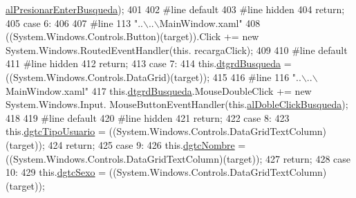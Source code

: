 \begin{DoxyCode}
      \hyperlink{class_proyecto___integrador__3_1_1_main_window_add266d3adbe6dc3acb7eddcbcbacf80e}{alPresionarEnterBusqueda});
401             
402 \textcolor{preprocessor}{            #line default}
403 \textcolor{preprocessor}{}\textcolor{preprocessor}{            #line hidden}
404 \textcolor{preprocessor}{}            \textcolor{keywordflow}{return};
405             \textcolor{keywordflow}{case} 6:
406             
407 \textcolor{preprocessor}{            #line 113 "..\(\backslash\)..\(\backslash\)MainWindow.xaml"}
408 \textcolor{preprocessor}{}            ((System.Windows.Controls.Button)(target)).Click += \textcolor{keyword}{new} System.Windows.RoutedEventHandler(\textcolor{keyword}{this}.
      recargaClick);
409             
410 \textcolor{preprocessor}{            #line default}
411 \textcolor{preprocessor}{}\textcolor{preprocessor}{            #line hidden}
412 \textcolor{preprocessor}{}            \textcolor{keywordflow}{return};
413             \textcolor{keywordflow}{case} 7:
414             this.\hyperlink{class_proyecto___integrador__3_1_1_main_window_aa4ad8e119bd619ccc03b22de048dfe57}{dtgrdBusqueda} = ((System.Windows.Controls.DataGrid)(target));
415             
416 \textcolor{preprocessor}{            #line 116 "..\(\backslash\)..\(\backslash\)MainWindow.xaml"}
417 \textcolor{preprocessor}{}            this.\hyperlink{class_proyecto___integrador__3_1_1_main_window_aa4ad8e119bd619ccc03b22de048dfe57}{dtgrdBusqueda}.MouseDoubleClick += \textcolor{keyword}{new} System.Windows.Input.
      MouseButtonEventHandler(this.\hyperlink{class_proyecto___integrador__3_1_1_main_window_a45bf387a5341eeedd23517408ad9a4c0}{alDobleClickBusqueda});
418             
419 \textcolor{preprocessor}{            #line default}
420 \textcolor{preprocessor}{}\textcolor{preprocessor}{            #line hidden}
421 \textcolor{preprocessor}{}            \textcolor{keywordflow}{return};
422             \textcolor{keywordflow}{case} 8:
423             this.\hyperlink{class_proyecto___integrador__3_1_1_main_window_a7760fc254a46e1c3b276f91e25f17a6a}{dgtcTipoUsuario} = ((System.Windows.Controls.DataGridTextColumn)(target));
424             \textcolor{keywordflow}{return};
425             \textcolor{keywordflow}{case} 9:
426             this.\hyperlink{class_proyecto___integrador__3_1_1_main_window_a867d58258d7e2baa1b4d446dda2f2c51}{dgtcNombre} = ((System.Windows.Controls.DataGridTextColumn)(target));
427             \textcolor{keywordflow}{return};
428             \textcolor{keywordflow}{case} 10:
429             this.\hyperlink{class_proyecto___integrador__3_1_1_main_window_a62ea2abb05ef20cbb64ebc690ca3011d}{dgtcSexo} = ((System.Windows.Controls.DataGridTextColumn)(target));

\end{DoxyCode}
